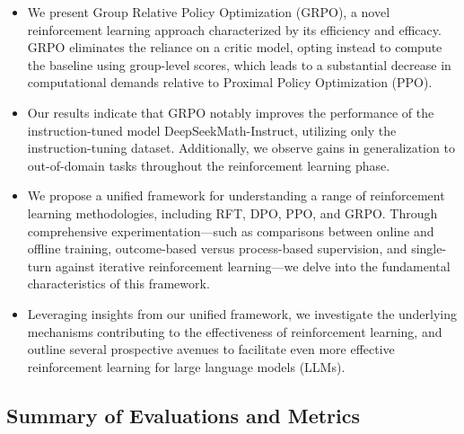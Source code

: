 \begin{itemize}[topsep=0pt]
    \item We present Group Relative Policy Optimization (GRPO), a novel reinforcement learning approach characterized by its efficiency and efficacy. GRPO eliminates the reliance on a critic model, opting instead to compute the baseline using group-level scores, which leads to a substantial decrease in computational demands relative to Proximal Policy Optimization (PPO).
    \item Our results indicate that GRPO notably improves the performance of the instruction-tuned model DeepSeekMath-Instruct, utilizing only the instruction-tuning dataset. Additionally, we observe gains in generalization to out-of-domain tasks throughout the reinforcement learning phase.
    \item We propose a unified framework for understanding a range of reinforcement learning methodologies, including RFT, DPO, PPO, and GRPO. Through comprehensive experimentation—such as comparisons between online and offline training, outcome-based versus process-based supervision, and single-turn against iterative reinforcement learning—we delve into the fundamental characteristics of this framework.
    \item Leveraging insights from our unified framework, we investigate the underlying mechanisms contributing to the effectiveness of reinforcement learning, and outline several prospective avenues to facilitate even more effective reinforcement learning for large language models (LLMs).
\end{itemize}

\subsection{Summary of Evaluations and Metrics}

